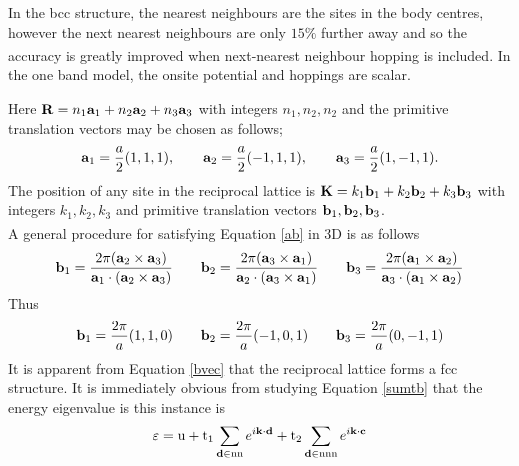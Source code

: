 \documentclass[a4paper, 12pt]{article}
\begin{document}
In the \gls{bcc} structure, the nearest neighbours are the sites in the body centres, however the next nearest neighbours are only $15\%$ further away and so the accuracy is greatly improved when next-nearest neighbour hopping is included\textsuperscript{\textcolor{blue}{\cite{harrison}}}.
		In the one band model, the onsite potential and hoppings are scalar.
		\\\par Here ${\bf R} = n_1{\bf a}_1 + n_2{\bf a}_2 + n_3{\bf a}_3$ with integers $n_1,n_2,n_2$ and the primitive translation vectors may be chosen as follows;
		\begin{equation}
		{\bf a}_1 = \frac{a}{2}(1,1,1),\qquad {\bf a}_2 = \frac{a}{2}(-1,1,1),\qquad {\bf a}_3=\frac{a}{2}(1,-1,1). 
		\end{equation}
		The position of any site in the reciprocal lattice is ${\bf K} = k_1{\bf b}_1 + k_2{\bf b}_2 + k_3{\bf b}_3$ with integers $k_1,k_2,k_3$ and primitive translation vectors ${\bf b}_1,{\bf b}_2,{\bf b}_3$. 
		\\A general procedure for satisfying Equation \eqref{ab} in 3D is as follows\textsuperscript{\textcolor{blue}{\cite{datta}}}
		\begin{equation}
			{\bf b}_1 = \frac{2\pi({\bf a}_2 \times {\bf a}_3)}{{\bf a}_1\cdot ({\bf a}_2 \times {\bf a}_3)}
			\qquad {\bf b}_2 = \frac{2\pi({\bf a}_3 \times {\bf a}_1)}{{\bf a}_2\cdot ({\bf a}_3 \times {\bf a}_1)}
			\qquad {\bf b}_3 = \frac{2\pi({\bf a}_1 \times {\bf a}_2)}{{\bf a}_3\cdot ({\bf a}_1 \times {\bf a}_2)}
		\end{equation}
		Thus
		\begin{equation}\label{bvec}
			{\bf b}_1 = \frac{2\pi}{a}(1,1,0)\qquad {\bf b}_2 = \frac{2\pi}{a}(-1,0,1)\qquad {\bf b}_3 = \frac{2\pi}{a}(0,-1,1)
		\end{equation}
		It is apparent from Equation \eqref{bvec} that the reciprocal lattice forms a \gls{fcc} structure.
		It is immediately obvious from studying Equation \eqref{sumtb} that the energy eigenvalue is this instance is
		\begin{equation}\label{ebcc}
			\varepsilon = {\rm u} + {\rm t}_1\sum_{{\bf d}\in {\rm nn}} e^{i{\bf k \cdot d}} + {\rm t}_2\sum_{{\bf d}\in {\rm nnn}} e^{i{\bf k \cdot c}}
		\end{equation}
\end{document}

